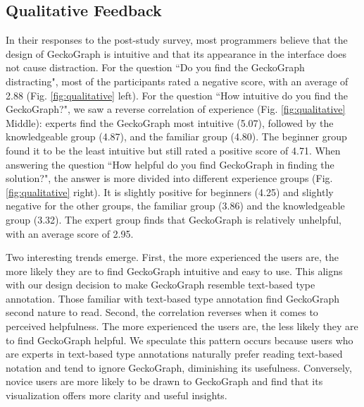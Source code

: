 \documentclass[preprint,12pt]{elsarticle}
\begin{document}
\subsection{Qualitative Feedback}
In their responses to the post-study survey, most programmers believe that the design of GeckoGraph is intuitive and that its appearance in the interface does not cause distraction.
For the question ``Do you find the GeckoGraph distracting", most of the participants rated a negative score, with an average of 2.88 (Fig. \ref{fig:qualitative} left). For the question ``How intuitive do you find the GeckoGraph?", we saw a reverse correlation of experience (Fig. \ref{fig:qualitative} Middle): experts find the GeckoGraph most intuitive (5.07), followed by the knowledgeable group (4.87), and the familiar group (4.80). The beginner group found it to be the least intuitive but still rated a positive score of 4.71. 
When answering the question ``How helpful do you find GeckoGraph in finding the solution?", the answer is more divided into different experience groups (Fig. \ref{fig:qualitative} right). It is slightly positive for beginners (4.25) and slightly negative for the other groups, the familiar group (3.86) and the knowledgeable group (3.32). The expert group finds that GeckoGraph is relatively unhelpful, with an average score of 2.95.

Two interesting trends emerge. First, the more experienced the users are, the more likely they are to find GeckoGraph intuitive and easy to use. This aligns with our design decision to make GeckoGraph resemble text-based type annotation. Those familiar with text-based type annotation find GeckoGraph second nature to read. Second, the correlation reverses when it comes to perceived helpfulness. The more experienced the users are, the less likely they are to find GeckoGraph helpful. We speculate this pattern occurs because users who are experts in text-based type annotations naturally prefer reading text-based notation and tend to ignore GeckoGraph, diminishing its usefulness. Conversely, novice users are more likely to be drawn to GeckoGraph and find that its visualization offers more clarity and useful insights.


\end{document}
